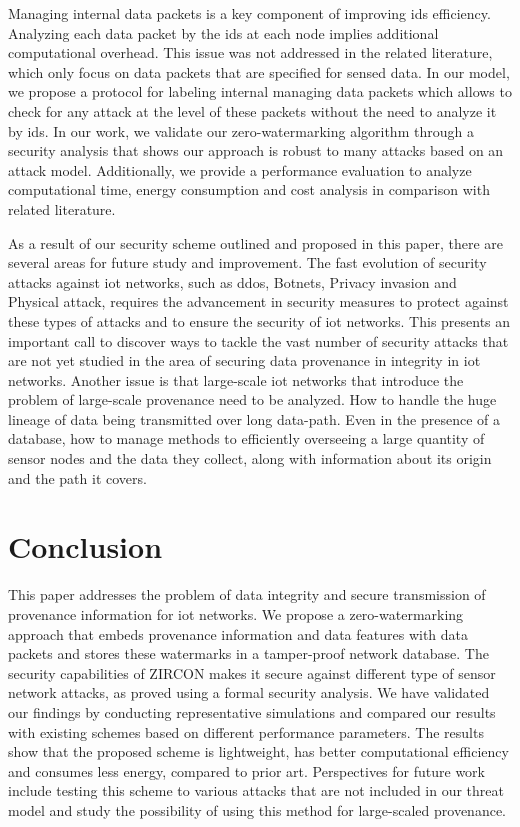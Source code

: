 \documentclass{llncs}
\begin{document}
Managing internal data packets is a key component of improving \gls*{ids} efficiency. Analyzing each data packet by the \gls*{ids} at each node implies additional computational overhead. This issue was not addressed in the related literature, which only focus on data packets that are specified for sensed data. In our model, we propose a protocol for labeling internal managing data packets which allows to check for any attack at the level of these packets without the need to analyze it by \gls*{ids}. In our work, we validate our zero-watermarking algorithm through a security analysis that shows our approach is robust to many attacks based on an attack model. Additionally, we provide a performance evaluation to analyze computational time, energy consumption and cost analysis in comparison with related literature.   

As a result of our security scheme outlined and proposed in this paper, there are several areas for future study and improvement. The fast evolution of security attacks against \gls*{iot} networks, such as \gls*{ddos}, Botnets, Privacy invasion and Physical attack, requires the advancement in security measures to protect against these types of attacks and to ensure the security of \gls*{iot} networks. This presents an important call to discover ways to tackle the vast number of security attacks that are not yet studied in the area of securing data provenance in integrity in \gls*{iot} networks. Another issue is that large-scale \gls*{iot} networks that introduce the problem of large-scale provenance need to be analyzed. How to handle the huge lineage of data being transmitted over long data-path. Even in the presence of a database, how to manage methods to efficiently overseeing a large quantity of sensor nodes and the data they collect, along with information about its origin and the path it covers. 


\section{Conclusion}
\label{sec:conclusion}

This paper addresses the problem of data integrity and secure transmission of provenance information for \gls*{iot} networks. We propose a zero-watermarking approach that embeds provenance information and data features with data packets and stores these watermarks in a tamper-proof network database. The security capabilities of ZIRCON makes it secure against different type of sensor network attacks, as proved using a formal security analysis. We have validated our findings by conducting representative simulations and compared our results with existing schemes based on different performance parameters. The results show that the proposed scheme is lightweight, has better computational efficiency and consumes less energy, compared to prior art. Perspectives for future work include testing this scheme to various attacks that are not included in our threat model and study the possibility of using this method for large-scaled provenance.
\end{document}
